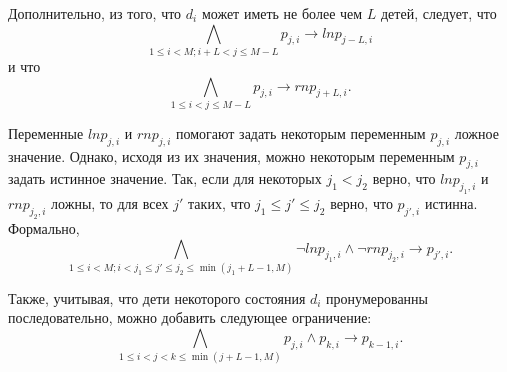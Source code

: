 Дополнительно, из того, что $d_{i}$ может иметь не более чем $L$ детей, следует, что $$\bigwedge_{1 \leq i < M; i + L < j \leq M - L} p_{j,i} \rightarrow \mathit{lnp}_{j - L, i}$$ и что $$\bigwedge_{1 \leq i < j \leq M - L} p_{j,i} \rightarrow \mathit{rnp}_{j + L, i}.$$

Переменные $\mathit{lnp}_{j,i}$ и $\mathit{rnp}_{j,i}$ помогают задать некоторым переменным $p_{j,i}$ ложное значение.
Однако, исходя из их значения, можно некоторым переменным $p_{j,i}$ задать истинное значение.
Так, если для некоторых $j_{1} < j_{2}$ верно, что $\mathit{lnp}_{j_{1}, i}$ и $\mathit{rnp}_{j_{2}, i}$ ложны, то для всех $j'$ таких, что $j_{1} \leq j' \leq j_{2}$ верно, что $p_{j',i}$ истинна.
Формально, $$\bigwedge_{1 \leq i < M;i < j_{1} \leq j' \leq j_{2} \leq \min\left(j_{1} + L - 1, M\right)} \neg \mathit{lnp}_{j_{1},i} \wedge \neg \mathit{rnp}_{j_{2},i} \rightarrow p_{j',i}.$$

Также, учитывая, что дети некоторого состояния $d_{i}$ пронумерованны последовательно, можно добавить следующее ограничение: $$\bigwedge_{1 \leq i < j < k \leq \min(j + L - 1, M)} p_{j,i} \wedge p_{k,i} \rightarrow p_{k - 1, i}.$$ 